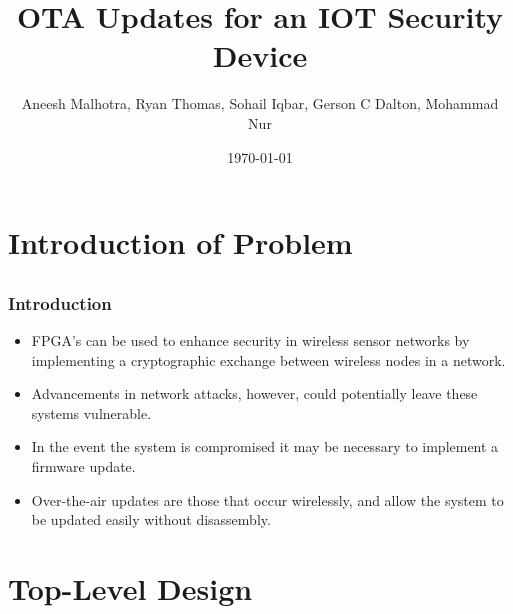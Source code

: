 \documentclass{beamer}
\title{OTA Updates for an IOT Security Device}
\author{Aneesh Malhotra, Ryan Thomas, Sohail Iqbar, Gerson C Dalton, Mohammad Nur}
\date{\today}
\begin{document}
\frame{\titlepage}

\section[Outline]{}
\frame{\tableofcontents}

\section{Introduction of Problem}
\subsection{}
\frame
{
  \frametitle{Introduction}
  
  \begin{itemize}
  \item FPGA's can be used to enhance security in wireless sensor networks by implementing a cryptographic exchange between wireless nodes in a network. 
  \item Advancements in network attacks, however, could potentially leave these systems vulnerable. 
  \item In the event the system is compromised it may be necessary to implement a firmware update. 
  \item Over-the-air updates are those that occur wirelessly, and allow the system to be updated easily without disassembly. 

  \end{itemize}
}


\section{Top-Level Design}
\end{document}
